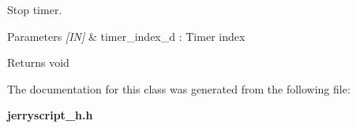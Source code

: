 Stop timer. 


\begin{DoxyCode}{0}
\DoxyCodeLine{\{}
\DoxyCodeLine{\}}
\end{DoxyCode}



\begin{DoxyParams}{Parameters}
{\em \mbox{[}\+I\+N\mbox{]}} & timer\+\_\+index\+\_\+d \+: Timer index \\
\hline
\end{DoxyParams}
\begin{DoxyReturn}{Returns}
void 
\end{DoxyReturn}


The documentation for this class was generated from the following file\+:\begin{DoxyCompactItemize}
\item 
\textbf{ jerryscript\+\_\+h.\+h}\end{DoxyCompactItemize}
